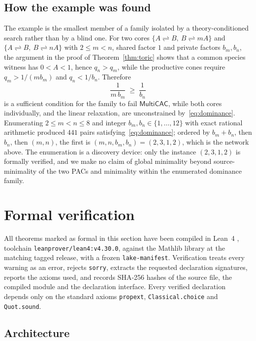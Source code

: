 \documentclass[11pt,a4paper]{article}
\theoremstyle{plain}
\theoremstyle{definition}
\theoremstyle{remark}
\newcommand{\MCAC}{\mathsf{MultiCAC}}
\newcommand{\lean}[1]{\texttt{#1}}
\newcommand{\rev}{\rightleftharpoons}
\begin{document}
\subsection{How the example was found}

The example is the smallest member of a family isolated by a theory-conditioned search rather than by a blind one. For two cores $\{A\rev B,\ B\rev mA\}$ and $\{A\rev B,\ B\rev nA\}$ with $2\le m<n$, shared factor $1$ and private factors $b_m,b_n$, the argument in the proof of Theorem~\ref{thm:toric} shows that a common species witness has $0<A<1$, hence $q_n>q_m$, while the productive cones require $q_m>1/(mb_m)$ and $q_n<1/b_n$. Therefore
\begin{equation}\label{eq:dominance}
  \frac{1}{m\,b_m}\;\ge\;\frac1{b_n}
\end{equation}
is a sufficient condition for the family to fail $\MCAC$, while both cores individually, and the linear relaxation, are unconstrained by~\eqref{eq:dominance}. Enumerating $2\le m<n\le8$ and integer $b_m,b_n\in\{1,\dots,12\}$ with exact rational arithmetic produced $441$ pairs satisfying~\eqref{eq:dominance}; ordered by $b_m+b_n$, then $b_n$, then $(m,n)$, the first is $(m,n,b_m,b_n)=(2,3,1,2)$, which is the network above. The enumeration is a discovery device: only the instance $(2,3,1,2)$ is formally verified, and we make no claim of global minimality beyond source-minimality of the two PACs and minimality within the enumerated dominance family.

\section{Formal verification}\label{sec:formal}

All theorems marked as formal in this section have been compiled in Lean~4 \citep{demoura2021}, toolchain \lean{leanprover/lean4:v4.30.0}, against the Mathlib library \citep{mathlib2020} at the matching tagged release, with a frozen \lean{lake-manifest}. Verification treats every warning as an error, rejects \lean{sorry}, extracts the requested declaration signatures, reports the axioms used, and records SHA-256 hashes of the source file, the compiled module and the declaration interface. Every verified declaration depends only on the standard axioms \lean{propext}, \lean{Classical.choice} and \lean{Quot.sound}.

\subsection{Architecture}
\end{document}

